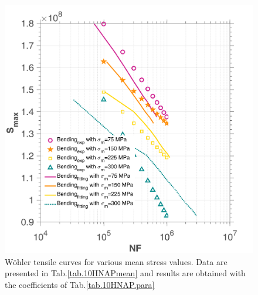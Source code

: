 \documentclass[3p,times,procedia,number]{elsarticle}
\begin{document}
\begin{figure}[!h]
	\centering
	\includegraphics[width=\textwidth]{figures//10HNAP_b1D_m_sn.png} 
	\caption{Wöhler tensile curves for various mean stress values. Data are presented in Tab.\ref{tab.10HNAPmean} and results are obtained with the coefficients of Tab.\ref{tab.10HNAP.para}}
	\label{fig.b1Dm10HNAPsn}
\end{figure}
\end{document}
